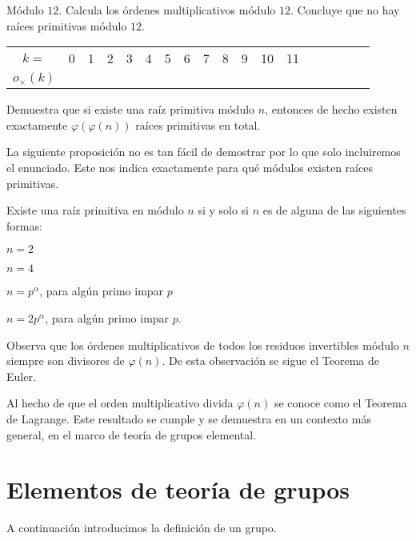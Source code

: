 \begin{ejercicio}
Módulo $12$. Calcula los órdenes multiplicativos módulo $12$. Concluye que no hay raíces primitivas módulo $12$.

\begin{tabular}{c||c|c|c|c|c|c|c|c|c|c|c|c|c|c|c|c|c|}
    $k=$ & 0 & 1 & 2 & 3 & 4 & 5 & 6 & 7 & 8 & 9 & 10 & 11 \\
    $o_{\times}(k)$ & &&&&&& & &&&&
\end{tabular}
\end{ejercicio}

\begin{ejercicio}
Demuestra que si existe una raíz primitiva módulo $n$, entonces de hecho existen exactamente $\varphi(\varphi(n))$ raíces primitivas en total.  
\end{ejercicio}

La siguiente proposición no es tan fácil de demostrar por lo que solo incluiremos el enunciado. Este nos indica exactamente para qué módulos existen raíces primitivas.

\begin{proposicion}
Existe una raíz primitiva en módulo $n$ si y solo si $n$ es de alguna de las siguientes formas:

$n=2$

$n=4$

$n=p^{\alpha}$, para algún primo impar $p$

$n=2p^{\alpha}$, para algún primo impar $p$.
\end{proposicion}

Observa que los órdenes multiplicativos de todos los residuos invertibles módulo $n$ siempre son divisores de $\varphi (n)$. De esta observación se sigue el Teorema de Euler.

Al hecho de que el orden multiplicativo divida $\varphi(n)$ se conoce como el Teorema de Lagrange. Este resultado se cumple y se demuestra en un contexto más general, en el marco de teoría de grupos elemental.

\newpage

\section{Elementos de teoría de grupos}

A continuación introducimos la definición de un grupo.

